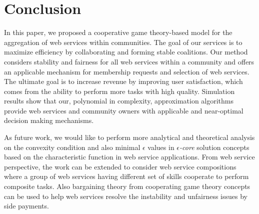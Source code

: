 \documentclass[10pt,journal,cspaper,compsoc]{IEEEtran}
\begin{document}
\section{Conclusion}\label{s:conclusion}

In this paper, we proposed a cooperative game theory-based model
for the aggregation of web services within communities. The goal
of our services is to maximize efficiency by collaborating and
forming stable coalitions. Our method considers stability and
fairness for all web services within a community and offers an
applicable mechanism for membership requests and selection of web
services. The ultimate goal is to increase revenue by improving
user satisfaction, which comes from the ability to perform more
tasks with high quality. Simulation results show that our,
polynomial in complexity, approximation algorithms provide web
services and community owners with applicable and near-optimal
decision making mechanisms.

As future work, we would like to perform more analytical and
theoretical analysis on the convexity condition and also minimal
$\epsilon$ values in \emph{$\epsilon$-core} solution concepts
based on the characteristic function in web service applications.
From web service perspective, the work can be extended to consider
web service compositions where a group of web services having
different set of skills cooperate to perform composite tasks. Also
bargaining theory from cooperating game theory concepts can be
used to help web services resolve the instability and unfairness
issues by side payments.






%
\end{document}
